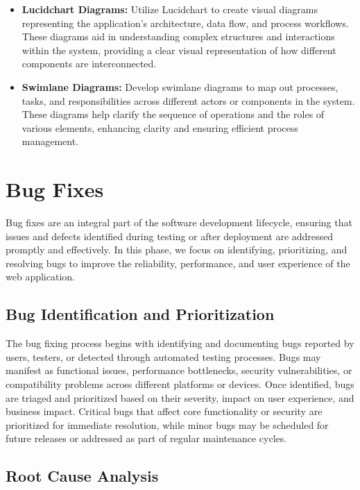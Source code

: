 \documentclass[12pt,a4paper]{report}
\begin{document}
\begin{itemize}
    \item \textbf{Lucidchart Diagrams:} Utilize Lucidchart to create visual diagrams representing the application's architecture, data flow, and process workflows. These diagrams aid in understanding complex structures and interactions within the system, providing a clear visual representation of how different components are interconnected.

    \item \textbf{Swimlane Diagrams:} Develop swimlane diagrams to map out processes, tasks, and responsibilities across different actors or components in the system. These diagrams help clarify the sequence of operations and the roles of various elements, enhancing clarity and ensuring efficient process management.

\end{itemize}

\section{Bug Fixes}

Bug fixes are an integral part of the software development lifecycle, ensuring that issues and defects identified during testing or after deployment are addressed promptly and effectively. In this phase, we focus on identifying, prioritizing, and resolving bugs to improve the reliability, performance, and user experience of the web application.

\subsection{Bug Identification and Prioritization}

The bug fixing process begins with identifying and documenting bugs reported by users, testers, or detected through automated testing processes. Bugs may manifest as functional issues, performance bottlenecks, security vulnerabilities, or compatibility problems across different platforms or devices. Once identified, bugs are triaged and prioritized based on their severity, impact on user experience, and business impact. Critical bugs that affect core functionality or security are prioritized for immediate resolution, while minor bugs may be scheduled for future releases or addressed as part of regular maintenance cycles.

\subsection{Root Cause Analysis}
\end{document}
